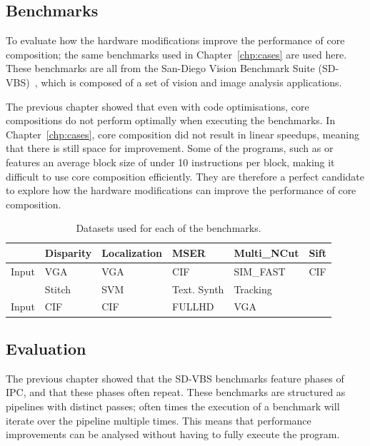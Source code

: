 \subsection{Benchmarks}
To evaluate how the hardware modifications improve the performance of core composition; the same benchmarks used in Chapter~\ref{chp:cases} are used here.
These benchmarks are all from the San-Diego Vision Benchmark Suite (SD-VBS)~\cite{sdvbs}, which is composed of a set of vision and image analysis applications.

The previous chapter showed that even with code optimisations, core compositions do not perform optimally when executing the benchmarks.
In Chapter~\ref{chp:cases}, core composition did not result in linear speedups, meaning that there is still space for improvement.
Some of the programs, such as  or  features an average block size of under 10 instructions per block, making it difficult to use core composition efficiently.
They are therefore a perfect candidate to explore how the hardware modifications can improve the performance of core composition.

\begin{table}[t]
  \small
  \centering
 \begin{tabular} {| l | l | l | l | l | l | }
 \hline
   & \cellcolor[gray]{0.7}Disparity & \cellcolor[gray]{0.7} Localization& \cellcolor[gray]{0.7} MSER& \cellcolor[gray]{0.7} Multi\_NCut& \cellcolor[gray]{0.7} Sift\\ \hline
Input&	VGA  & VGA & CIF  & SIM\_FAST& CIF\\ \hline
	
	 & \cellcolor[gray]{0.7} Stitch & \cellcolor[gray]{0.7} SVM & \cellcolor[gray]{0.7} Text. Synth & \cellcolor[gray]{0.7} Tracking&\\ \hline
	  Input & CIF& CIF& FULLHD& VGA &\\ \hline

	\end{tabular}
  \caption{Datasets used for each of the benchmarks.}\label{tab:sd-data2}
\end{table}
\subsection{Evaluation} 
The previous chapter showed that the SD-VBS benchmarks feature phases of IPC, and that these phases often repeat.
These benchmarks are structured as pipelines with distinct passes; often times the execution of a benchmark will iterate over the pipeline multiple times.
This means that performance improvements can be analysed without having to fully execute the program.

